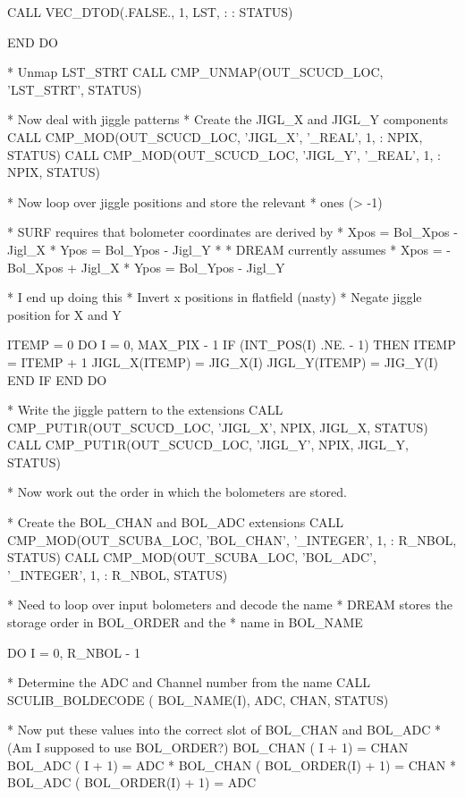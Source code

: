 \documentclass[twoside,11pt,nolof]{starlink}
\begin{document}
\begin{small}
\begin{terminalv}
         CALL VEC_DTOD(.FALSE., 1, LST,
     :        %
     :        STATUS)

      END DO

*     Unmap LST_STRT
      CALL CMP_UNMAP(OUT_SCUCD_LOC, 'LST_STRT', STATUS)

*     Now deal with jiggle patterns
*     Create the JIGL_X and JIGL_Y components
      CALL CMP_MOD(OUT_SCUCD_LOC, 'JIGL_X', '_REAL', 1,
     :     NPIX, STATUS)
      CALL CMP_MOD(OUT_SCUCD_LOC, 'JIGL_Y', '_REAL', 1,
     :     NPIX, STATUS)

*     Now loop over jiggle positions and store the relevant
*     ones (> -1)

*     SURF requires that bolometer coordinates are derived by
*          Xpos = Bol_Xpos - Jigl_X
*          Ypos = Bol_Ypos - Jigl_Y
*
*     DREAM currently assumes
*          Xpos = -Bol_Xpos + Jigl_X
*          Ypos =  Bol_Ypos - Jigl_Y

*     I end up doing this
*          Invert x positions in flatfield (nasty)
*          Negate jiggle position for X and Y

      ITEMP = 0
      DO I = 0, MAX_PIX  - 1
         IF (INT_POS(I) .NE. - 1) THEN
            ITEMP = ITEMP + 1
            JIGL_X(ITEMP) = JIG_X(I)
            JIGL_Y(ITEMP) = JIG_Y(I)
         END IF
      END DO


*     Write the jiggle pattern to the extensions
      CALL CMP_PUT1R(OUT_SCUCD_LOC, 'JIGL_X', NPIX, JIGL_X, STATUS)
      CALL CMP_PUT1R(OUT_SCUCD_LOC, 'JIGL_Y', NPIX, JIGL_Y, STATUS)


*     Now work out the order in which the bolometers are stored.

*     Create the BOL_CHAN and BOL_ADC extensions
      CALL CMP_MOD(OUT_SCUBA_LOC, 'BOL_CHAN', '_INTEGER', 1,
     :     R_NBOL, STATUS)
      CALL CMP_MOD(OUT_SCUBA_LOC, 'BOL_ADC', '_INTEGER', 1,
     :     R_NBOL, STATUS)


*     Need to loop over input bolometers and decode the name
*     DREAM stores the storage order in BOL_ORDER and the
*     name in BOL_NAME

      DO I = 0, R_NBOL - 1

*     Determine the ADC and Channel number from the name
         CALL SCULIB_BOLDECODE ( BOL_NAME(I), ADC, CHAN, STATUS)

*     Now put these values into the correct slot of BOL_CHAN and BOL_ADC
*     (Am I supposed to use BOL_ORDER?)
         BOL_CHAN ( I + 1) = CHAN
         BOL_ADC ( I + 1) = ADC
*         BOL_CHAN ( BOL_ORDER(I) + 1) = CHAN
*         BOL_ADC ( BOL_ORDER(I) + 1) = ADC


\end{terminalv}
\end{small}
\end{document}
